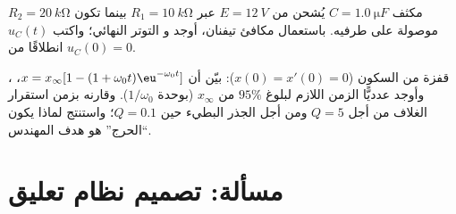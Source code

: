 \begin{exercise}[$\star\star\star$]\label{exo:b1:transient-regimes:11}
مكثف $C = \qty{1.0}{\micro F}$ يُشحن من $E = \qty{12}{V}$
عبر $R_1 = \qty{10}{k\ohm}$ بينما تكون $R_2 = \qty{20}{k\ohm}$ موصولة
على طرفيه. باستعمال مكافئ تيفنان، أوجد  و
التوتر النهائي؛ واكتب $u_C(t)$ انطلاقًا من $u_C(0) = 0$.
\end{exercise}

\begin{exercise}[$\star\star\star$]\label{exo:b1:transient-regimes:12}
، قفزة من السكون ($x(0) = x'(0) = 0$): بيّن أن
$x = x_\infty[1 - (1 + \omega_0 t)\eu^{-\omega_0 t}]$، وأوجد
عدديًّا الزمن اللازم لبلوغ $95\%$ من $x_\infty$ (بوحدة
$1/\omega_0$). وقارنه بزمن استقرار الغلاف من أجل $Q = 5$
ومن أجل الجذر البطيء حين $Q = 0.1$؛ واستنتج لماذا يكون ``الحرج'' هو
هدف المهندس.
\end{exercise}

\section{مسألة: تصميم نظام تعليق}

